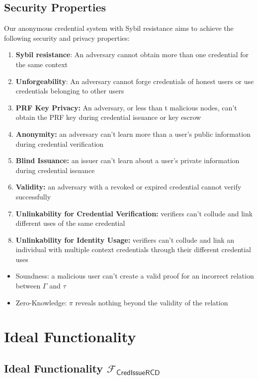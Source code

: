 \subsection{Security Properties}
Our anonymous credential system with Sybil resistance aims to achieve the following security and privacy properties:
\begin{enumerate}
    \item \textbf{Sybil resistance}: An adversary cannot obtain more than one credential for the same context
    \item \textbf{Unforgeability}: An adversary cannot forge credentials of honest users or use credentials belonging to other users
    \item \textbf{PRF Key Privacy: } An adversary, or less than t malicious nodes, can't obtain the PRF key during credential issuance or key escrow
    \item \textbf{Anonymity:} an adversary can't learn more than a user's public information during credential verification
    \item \textbf{Blind Issuance:} an issuer can't learn about a user's private information during credential issuance
    \item \textbf{Validity:} an adversary with a revoked or expired credential cannot verify successfully
    \item \textbf{Unlinkability for Credential Verification:} verifiers can't collude and link different uses of the same credential
    \item \textbf{Unlinkability for Identity Usage:} verifiers can't collude and link an individual with multiple context credentials through their different credential uses
\end{enumerate}

\begin{itemize}
    \item Soundness: a malicious user can't create a valid proof for an incorrect relation between $\Gamma$ and $\tau$
    \item Zero-Knowledge: $\pi$ reveals nothing beyond the validity of the relation
\end{itemize}

\section{Ideal Functionality}

\subsection{Ideal Functionality $\mathcal{F}_{\mathsf{CredIssueRCD}}$}

